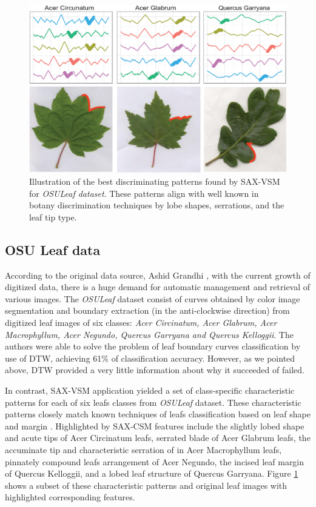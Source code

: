 \documentclass{llncs}
\newcommand{\myfigureshrinker}{\vspace{-1.1cm}}
\begin{document}
\begin{figure}[t]
   \myfigureshrinker
   \centering
   \includegraphics[width=115mm]{figures/AcerCircunatum.eps}
   \caption{Illustration of the best discriminating patterns found by SAX-VSM for
\textit{OSULeaf dataset}. These patterns align with well known in botany discrimination techniques
by lobe shapes, serrations, and the leaf tip type.}
   \label{fig:shapelet-acer-patterns}
\end{figure}

\subsection{OSU Leaf data}
According to the original data source, Ashid Grandhi \cite{osuleaf}, with the current growth of
digitized data, there is a huge demand for automatic management and retrieval of various images. The
\textit{OSULeaf} dataset consist of curves obtained by color image segmentation and boundary
extraction (in the anti-clockwise direction) from digitized leaf images of six classes: \textit{Acer
Circinatum, Acer Glabrum, Acer Macrophyllum, Acer Negundo, Quercus Garryana and Quercus Kelloggii}.
The authors were able to solve the problem of leaf boundary curves classification by use of DTW, 
achieving 61\% of classification accuracy. However, as we pointed above, DTW provided a
very little information about why it succeeded of failed. 

In contrast, SAX-VSM application yielded a set of class-specific characteristic patterns for each of
six leafs classes from \textit{OSULeaf} dataset. These characteristic patterns closely match
known techniques of leafs classification based on leaf shape and margin \cite{dirr}. 
Highlighted by SAX-CSM features include the slightly lobed shape and acute tips of
Acer Circinatum leafs, serrated blade of Acer Glabrum leafs, the accuminate tip and characteristic
serration of in Acer Macrophyllum leafs, pinnately compound leafs arrangement of Acer Negundo, the
incised leaf margin of Quercus Kelloggii, and a lobed leaf structure of Quercus Garryana. 
Figure \ref{fig:shapelet-acer-patterns} shows a subset of these characteristic patterns and original
leaf images with highlighted corresponding features.
\end{document}

